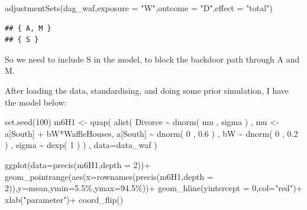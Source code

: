\documentclass[
]{book}
\newenvironment{Shaded}{\begin{snugshade}}{\end{snugshade}}
\newcommand{\AttributeTok}[1]{\textcolor[rgb]{0.77,0.63,0.00}{#1}}
\newcommand{\DecValTok}[1]{\textcolor[rgb]{0.00,0.00,0.81}{#1}}
\newcommand{\FloatTok}[1]{\textcolor[rgb]{0.00,0.00,0.81}{#1}}
\newcommand{\FunctionTok}[1]{\textcolor[rgb]{0.00,0.00,0.00}{#1}}
\newcommand{\NormalTok}[1]{#1}
\newcommand{\OtherTok}[1]{\textcolor[rgb]{0.56,0.35,0.01}{#1}}
\newcommand{\SpecialCharTok}[1]{\textcolor[rgb]{0.00,0.00,0.00}{#1}}
\newcommand{\StringTok}[1]{\textcolor[rgb]{0.31,0.60,0.02}{#1}}
\begin{document}
\begin{Shaded}
\begin{Highlighting}[]
\FunctionTok{adjustmentSets}\NormalTok{(dag\_waf,}\AttributeTok{exposure =} \StringTok{"W"}\NormalTok{,}\AttributeTok{outcome =} \StringTok{"D"}\NormalTok{,}\AttributeTok{effect =} \StringTok{"total"}\NormalTok{)}
\end{Highlighting}
\end{Shaded}

\begin{verbatim}
## { A, M }
## { S }
\end{verbatim}

So we need to include S in the model, to block the backdoor path through A and M.

After loading the data, standardising, and doing some prior simulation, I have the model below:

\begin{Shaded}
\begin{Highlighting}[]
\FunctionTok{set.seed}\NormalTok{(}\DecValTok{100}\NormalTok{)}
\NormalTok{m6H1 }\OtherTok{\textless{}{-}} \FunctionTok{quap}\NormalTok{( }
  \FunctionTok{alist}\NormalTok{(}
\NormalTok{    Divorce }\SpecialCharTok{\textasciitilde{}} \FunctionTok{dnorm}\NormalTok{( mu , sigma ) , }
\NormalTok{    mu }\OtherTok{\textless{}{-}}\NormalTok{ a[South] }\SpecialCharTok{+}\NormalTok{ bW}\SpecialCharTok{*}\NormalTok{WaffleHouses, }
\NormalTok{    a[South] }\SpecialCharTok{\textasciitilde{}} \FunctionTok{dnorm}\NormalTok{( }\DecValTok{0}\NormalTok{ , }\FloatTok{0.6}\NormalTok{ ) , }
\NormalTok{    bW }\SpecialCharTok{\textasciitilde{}} \FunctionTok{dnorm}\NormalTok{( }\DecValTok{0}\NormalTok{ , }\FloatTok{0.2}\NormalTok{ ) , }
\NormalTok{    sigma }\SpecialCharTok{\textasciitilde{}} \FunctionTok{dexp}\NormalTok{( }\DecValTok{1}\NormalTok{ )}
\NormalTok{) , }\AttributeTok{data=}\NormalTok{data\_waf )}


\FunctionTok{ggplot}\NormalTok{(}\AttributeTok{data=}\FunctionTok{precis}\NormalTok{(m6H1,}\AttributeTok{depth =} \DecValTok{2}\NormalTok{))}\SpecialCharTok{+}
  \FunctionTok{geom\_pointrange}\NormalTok{(}\FunctionTok{aes}\NormalTok{(}\AttributeTok{x=}\FunctionTok{rownames}\NormalTok{(}\FunctionTok{precis}\NormalTok{(m6H1,}\AttributeTok{depth =} \DecValTok{2}\NormalTok{)),}\AttributeTok{y=}\NormalTok{mean,}\AttributeTok{ymin=}\StringTok{\textasciigrave{}}\AttributeTok{5.5\%}\StringTok{\textasciigrave{}}\NormalTok{,}\AttributeTok{ymax=}\StringTok{\textasciigrave{}}\AttributeTok{94.5\%}\StringTok{\textasciigrave{}}\NormalTok{))}\SpecialCharTok{+}
  \FunctionTok{geom\_hline}\NormalTok{(}\AttributeTok{yintercept =} \DecValTok{0}\NormalTok{,}\AttributeTok{col=}\StringTok{"red"}\NormalTok{)}\SpecialCharTok{+}
  \FunctionTok{xlab}\NormalTok{(}\StringTok{"parameter"}\NormalTok{)}\SpecialCharTok{+}
  \FunctionTok{coord\_flip}\NormalTok{()}
\end{Highlighting}
\end{Shaded}
\end{document}
